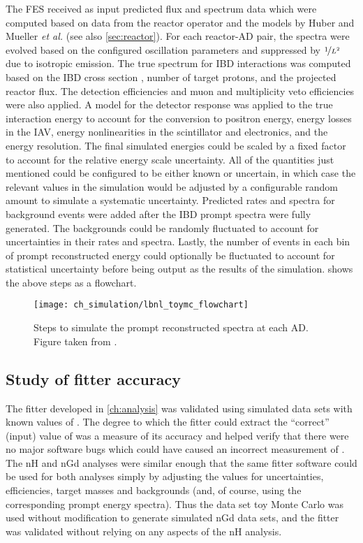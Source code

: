 The FES received as input predicted \nuebar{} flux and spectrum data
which were computed \cite{christine_reactor} based on data from the reactor operator
and the models by Huber \cite{reactor_huber}
and Mueller \emph{et al.} \cite{reactor_mueller} (see also \cref{sec:reactor}).
For each reactor-AD pair, the spectra were evolved
based on the configured oscillation parameters
and suppressed by $\nicefrac{1}{L^2}$ due to isotropic emission.
The true \nuebar{} spectrum for IBD interactions was computed
based on the IBD cross section \cite{ibd_xsec,ibd_xsec_note},
number of target protons, and the projected reactor flux.
The detection efficiencies and muon and multiplicity veto efficiencies
were also applied.
A model for the detector response was applied to the true interaction energy
to account for the conversion to positron energy,
energy losses in the IAV,
energy nonlinearities in the scintillator and electronics,
and the energy resolution.
The final simulated energies could be scaled by a fixed factor
to account for the relative energy scale uncertainty.
All of the quantities just mentioned could be configured
to be either known or uncertain, in which case
the relevant values in the simulation would be
adjusted by a configurable random amount
to simulate a systematic uncertainty.
Predicted rates and spectra for background events
were added after the IBD prompt spectra were fully generated.
The backgrounds could be randomly fluctuated to account for
uncertainties in their rates and spectra.
Lastly, the number of events in each bin of prompt reconstructed energy
could optionally be fluctuated to account for statistical uncertainty
before being output as the results of the simulation.
 shows the above steps as a flowchart.

\begin{figure}
    \centering
    \texttt{[image: ch\_simulation/lbnl\_toymc\_flowchart]}
    \caption[Flowchart of data set toy Monte Carlo]{
        Steps to simulate the prompt reconstructed spectra
        at each AD.
        Figure taken from \cite{lbnl_toymc}.
    }
    \label{fig:lbnl_toymc_flowchart}
\end{figure}

\subsection{Study of fitter accuracy}
\label{subsec:fitter_validation}

The fitter developed in \cref{ch:analysis} was validated
using simulated data sets with known values of \thetaot{}.
The degree to which the fitter could extract
the ``correct'' (input) value of \thetaot{}
was a measure of its accuracy
and helped verify that there were no major software bugs
which could have caused an incorrect measurement of \thetaot{}.
The nH and nGd analyses were similar enough
that the same fitter software could be used for both analyses
simply by adjusting the values for uncertainties, efficiencies,
target masses and backgrounds
(and, of course, using the corresponding prompt energy spectra).
Thus the data set toy Monte Carlo was used without modification
to generate simulated nGd data sets,
and the fitter was validated without relying on
any aspects of the nH analysis.

